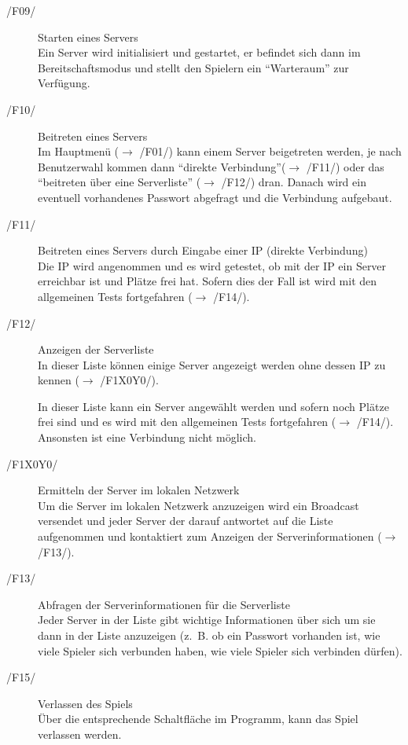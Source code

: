 \documentclass[a4paper,10pt]{article}
\begin{document}
\begin{description}
\item[/F09/] Starten eines Servers \\
Ein Server wird initialisiert und gestartet, er befindet sich dann im Bereitschaftsmodus und stellt den Spielern ein ``Warteraum'' zur Verfügung.

\item[/F10/] Beitreten eines Servers \\
Im Hauptmenü ($\rightarrow$ /F01/) kann einem Server beigetreten werden, je nach Benutzerwahl kommen dann ``direkte Verbindung''($\rightarrow$ /F11/) oder das ``beitreten über eine Serverliste'' ($\rightarrow$ /F12/) dran. Danach wird ein eventuell vorhandenes Passwort abgefragt und die Verbindung aufgebaut.

\item[/F11/] Beitreten eines Servers durch Eingabe einer IP (direkte Verbindung) \\
Die IP wird angenommen und es wird getestet, ob mit der IP ein Server erreichbar ist und Plätze frei hat. Sofern dies der Fall ist wird mit den allgemeinen Tests fortgefahren ($\rightarrow$ /F14/).

\item[/F12/] Anzeigen der Serverliste \\
In dieser Liste können einige Server angezeigt werden ohne dessen IP zu kennen ($\rightarrow$ /F1X0Y0/).

In dieser Liste kann ein Server angewählt werden und sofern noch Plätze frei sind und es wird mit den allgemeinen Tests fortgefahren ($\rightarrow$ /F14/). Ansonsten ist eine Verbindung nicht möglich.
\item[/F1X0Y0/] Ermitteln der Server im lokalen Netzwerk \\
Um die Server im lokalen Netzwerk anzuzeigen wird ein Broadcast versendet und jeder Server der darauf antwortet auf die Liste aufgenommen und kontaktiert zum Anzeigen der Serverinformationen ($\rightarrow$ /F13/).
\item[/F13/] Abfragen der Serverinformationen für die Serverliste \\
Jeder Server in der Liste gibt wichtige Informationen über sich um sie dann in der Liste anzuzeigen (z.~B. ob ein Passwort vorhanden ist, wie viele Spieler sich verbunden haben, wie viele Spieler sich verbinden dürfen).
\item[/F15/] Verlassen des Spiels \\
Über die entsprechende Schaltfläche im Programm, kann das Spiel verlassen werden.
\end{description}
\end{document}

